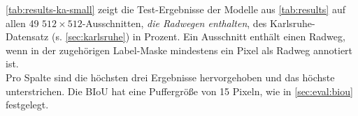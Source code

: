 \autoref{tab:results-ka-small} zeigt die Test-Ergebnisse der Modelle aus \autoref{tab:results} auf allen 49 $512{\times}512$-Ausschnitten, 
\textit{die Radwegen enthalten}, des Karlsruhe-Datensatz (s. \autoref{sec:karlsruhe}) in Prozent. 
Ein Ausschnitt enthält einen Radweg, wenn in der zugehörigen Label-Maske mindestens ein Pixel als Radweg annotiert ist. \\
Pro Spalte sind die höchsten drei Ergebnisse hervorgehoben und das höchste unterstrichen.
Die \ac{BIoU} hat eine Puffergröße von 15 Pixeln, wie in \autoref{sec:eval:biou} festgelegt.












